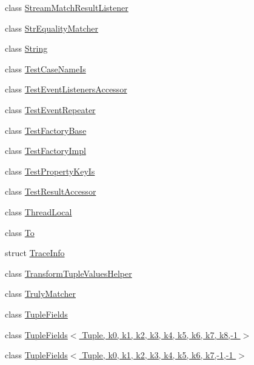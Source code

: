 \begin{DoxyCompactItemize}
\item 
class \hyperlink{classtesting_1_1internal_1_1_stream_match_result_listener}{Stream\+Match\+Result\+Listener}
\item 
class \hyperlink{classtesting_1_1internal_1_1_str_equality_matcher}{Str\+Equality\+Matcher}
\item 
class \hyperlink{classtesting_1_1internal_1_1_string}{String}
\item 
class \hyperlink{classtesting_1_1internal_1_1_test_case_name_is}{Test\+Case\+Name\+Is}
\item 
class \hyperlink{classtesting_1_1internal_1_1_test_event_listeners_accessor}{Test\+Event\+Listeners\+Accessor}
\item 
class \hyperlink{classtesting_1_1internal_1_1_test_event_repeater}{Test\+Event\+Repeater}
\item 
class \hyperlink{classtesting_1_1internal_1_1_test_factory_base}{Test\+Factory\+Base}
\item 
class \hyperlink{classtesting_1_1internal_1_1_test_factory_impl}{Test\+Factory\+Impl}
\item 
class \hyperlink{classtesting_1_1internal_1_1_test_property_key_is}{Test\+Property\+Key\+Is}
\item 
class \hyperlink{classtesting_1_1internal_1_1_test_result_accessor}{Test\+Result\+Accessor}
\item 
class \hyperlink{classtesting_1_1internal_1_1_thread_local}{Thread\+Local}
\item 
class \hyperlink{classtesting_1_1internal_1_1_to}{To}
\item 
struct \hyperlink{structtesting_1_1internal_1_1_trace_info}{Trace\+Info}
\item 
class \hyperlink{classtesting_1_1internal_1_1_transform_tuple_values_helper}{Transform\+Tuple\+Values\+Helper}
\item 
class \hyperlink{classtesting_1_1internal_1_1_truly_matcher}{Truly\+Matcher}
\item 
class \hyperlink{classtesting_1_1internal_1_1_tuple_fields}{Tuple\+Fields}
\item 
class \hyperlink{classtesting_1_1internal_1_1_tuple_fields_3_01_tuple_00_01k0_00_01k1_00_01k2_00_01k3_00_01k4_00_c1748b50f053abd55195ef8136fc372c}{Tuple\+Fields$<$ Tuple, k0, k1, k2, k3, k4, k5, k6, k7, k8,-\/1 $>$}
\item 
class \hyperlink{classtesting_1_1internal_1_1_tuple_fields_3_01_tuple_00_01k0_00_01k1_00_01k2_00_01k3_00_01k4_00_0063f8a87602abfee3b4568185bc2c75}{Tuple\+Fields$<$ Tuple, k0, k1, k2, k3, k4, k5, k6, k7,-\/1,-\/1 $>$}

\end{DoxyCompactItemize}
